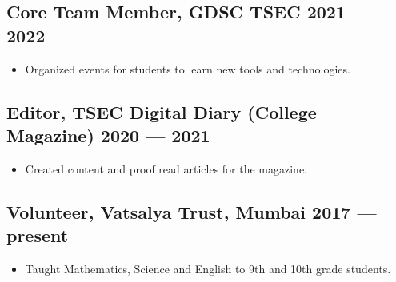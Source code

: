 \documentclass[10pt]{article}
\newenvironment{zitemize}{
\begin{itemize}\itemsep2pt \parskip0pt \parsep1pt}
{\end{itemize}\vspace{-0.7cm}}
\newcommand{\hskills}[1]{
\textbf{\bfseries #1} }
\begin{document}
\subsection*{Core Team Member, GDSC TSEC \hfill 2021 --- 2022} 
    \begin{zitemize}
            \item Organized events for students to learn new tools and technologies.
    \end{zitemize}

\subsection*{Editor, TSEC Digital Diary (College Magazine) \hfill 2020 --- 2021} 
    \begin{zitemize}
            \item Created content and proof read articles for the magazine.
    \end{zitemize}

\subsection*{Volunteer, Vatsalya Trust, Mumbai \hfill  2017 --- present} 
    \begin{zitemize}
            \item  Taught Mathematics, Science and English to 9th and 10th grade students.
    \end{zitemize}









\end{document}
